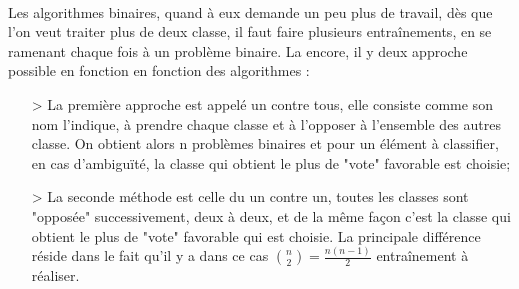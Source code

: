 \documentclass[a4paper,twoside]{report}
\begin{document}
\paragraph{}
Les algorithmes binaires, quand à eux demande un peu plus de travail, dès que l'on veut traiter plus de deux classe, il faut faire plusieurs entraînements, en se ramenant chaque fois à un problème binaire. La encore, il y deux approche possible en fonction en fonction des algorithmes :
 \begin{itemize}
   \item[>] La première approche est appelé un contre tous, elle consiste comme son nom l'indique, à prendre chaque classe et à l'opposer à l'ensemble des autres classe. On obtient alors n problèmes binaires et pour un élément à classifier, en cas d'ambiguïté, la classe qui obtient le plus de "vote" favorable est choisie;
   \item[>] La seconde méthode est celle du un contre un, toutes les classes sont "opposée" successivement, deux à deux, et de la même façon c'est la classe qui obtient le plus de "vote" favorable qui est choisie. La principale différence réside dans le fait qu'il y a dans ce cas ${n \choose 2}=\frac{n(n-1)}{2}$ entraînement à réaliser.
 \end{itemize}
\end{document}
